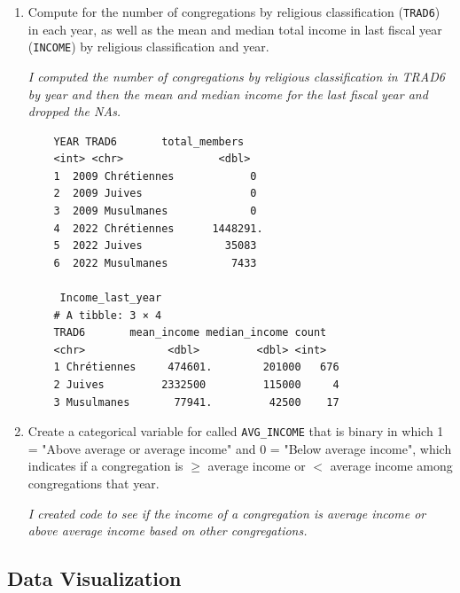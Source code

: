 \documentclass[12pt,letterpaper]{article}
\begin{document}
\begin{enumerate}
\item Compute for the number of congregations by religious classification (\texttt{TRAD6}) in each year, as well as the mean and median total income in last fiscal year (\texttt{INCOME}) by religious classification and year.

 

	\textit {I computed the number of congregations by religious classification in TRAD6 by year and then the mean and median income for the last fiscal year and dropped the NAs.}
	
		\begin{verbatim}
	YEAR TRAD6       total_members
	<int> <chr>               <dbl>
	1  2009 Chrétiennes            0 
	2  2009 Juives                 0 
	3  2009 Musulmanes             0 
	4  2022 Chrétiennes      1448291.
	5  2022 Juives             35083 
	6  2022 Musulmanes          7433
	
	 Income_last_year
	# A tibble: 3 × 4
	TRAD6       mean_income median_income count
	<chr>             <dbl>         <dbl> <int>
	1 Chrétiennes     474601.        201000   676
	2 Juives         2332500         115000     4
	3 Musulmanes       77941.         42500    17
	\end{verbatim}
	
	
\item Create a categorical variable for called \texttt{AVG\_INCOME} that is binary in which 1 = "Above average or average income" and 0 = "Below average income", which indicates if a congregation is $\geq$ average income or $<$ average income among congregations that year.

 

	\textit {I created code to see if the income of a congregation is average income 
		 or above average income based on other congregations.} 
		
\end{enumerate}

\subsection*{Data Visualization}
\end{document}

